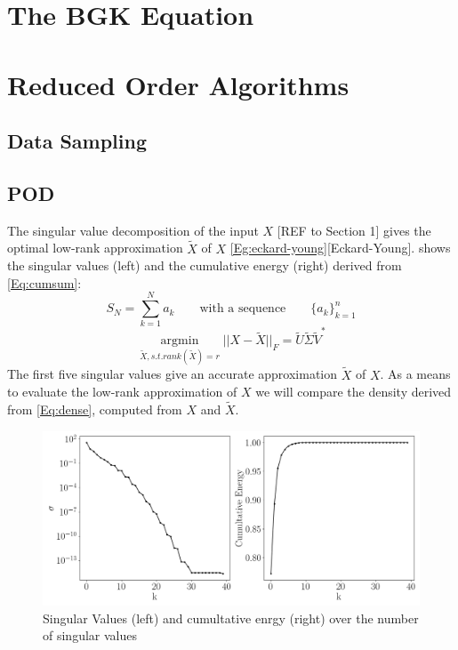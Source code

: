 \documentclass[12pt, a4paper]{article}
\begin{document}
\section{The BGK Equation}
\section{Reduced Order Algorithms}
\subsection{Data Sampling}
\subsection{POD}
The singular value decomposition of the input $X$ [REF to Section 1] gives the optimal low-rank approximation $\tilde{X}$ of $X$ \cref{Eg:eckard-young}[Eckard-Young].  shows the singular values (left) and the cumulative energy (right) derived from \cref{Eq:cumsum}:
\begin{equation}
S_N = \sum_{k=1}^{N}a_k \qquad\textrm{with a sequence} \qquad\{a_k\}_{k=1}^{n} 
\label{Eq:cumsum}
\end{equation}
\begin{equation}
\underset{\tilde{X}, s.t. rank(\tilde{X})=r}{\operatorname{argmin}} || X -\tilde{X} ||_F=\tilde{U}\tilde{\Sigma}\tilde{V}^*
\label{Eg:eckard-young}
\end{equation}
The first five singular values give an accurate approximation $\tilde{X}$ of $X$.  
As a means to evaluate the low-rank approximation of $X$ we will compare the density derived from \cref{Eq:dense}, computed from $X$ and $\tilde{X}$.
\begin{figure}[htb!]
	\centering
	\includegraphics[width=\textwidth]{Figures/Cumultative_Singular_Values_kn001.png}
	\caption{Singular Values (left) and cumultative enrgy (right) over the number of singular values}
	\label{Fig:cumu_sing}
\end{figure}
\end{document}
